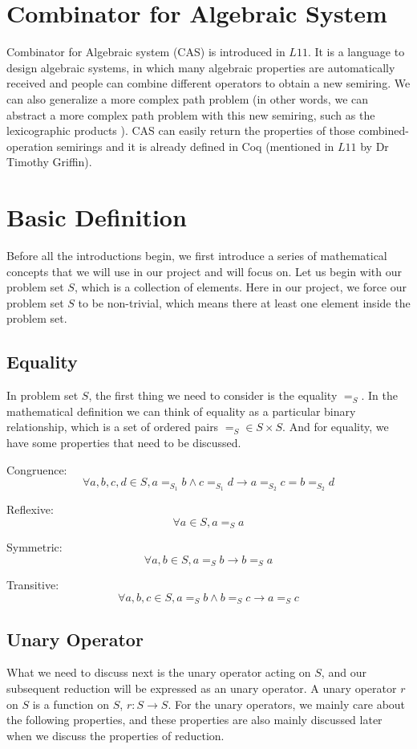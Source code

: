 \documentclass[a4paper,12pt,twoside,openright]{report}
\newcommand{\e}[2]{
\begin{equation}
  \label{#1} 
  #2
\end{equation}
}
\begin{document}
\section{Combinator for Algebraic System}
Combinator for Algebraic system (CAS)\cite{griffin_metarouting_2005} is introduced in $L11$. It is a language to design algebraic systems, in which many algebraic properties are automatically received and people can combine different operators to obtain a new semiring\cite{griffin_metarouting_2005}. We can also generalize a more complex path problem (in other words, we can abstract a more complex path problem with this new semiring, such as the lexicographic products \cite{gurney_lexicographic_2007}). CAS can easily return the properties of those combined-operation semirings and it is already defined in Coq\cite{Coq} (mentioned in $L11$ by Dr Timothy Griffin).

\section{Basic Definition}
Before all the introductions begin, we first introduce a series of mathematical concepts that we will use in our project and will focus on. 
Let us begin with our problem set $S$, which is a collection of elements. Here in our project, we force our problem set $S$ to be non-trivial, which means there at least one element inside the problem set.

\subsection{Equality}
In problem set $S$, the first thing we need to consider is the equality $=_S$. 
In the mathematical definition we can think of equality as a particular binary relationship, which is a set of ordered pairs $=_S \in S \times S$. And for equality, we have some properties that need to be discussed. 

Congruence: \e{def:eq:congruence}{\forall a,b,c,d \in S, a =_{S_1} b \wedge c =_{S_1} d \rightarrow a =_{S_2} c = b =_{S_2} d}
Reflexive: \e{def:eq:reflexive}{\forall a \in S, a =_S a}
Symmetric: \e{def:eq:symmetric}{\forall a,b \in S, a =_S b \rightarrow b =_S a}
Transitive: \e{def:eq:transitive}{\forall a,b,c \in S, a =_S b \wedge b=_S c \rightarrow a =_S c}

\subsection{Unary Operator}
What we need to discuss next is the unary operator acting on $S$, and our subsequent reduction will be expressed as an unary operator. A unary operator $r$ on $S$ is a function on $S$, $r : S \rightarrow S$. 
For the unary operators, we mainly care about the following properties, and these properties are also mainly discussed later when we discuss the properties of reduction.
\end{document}
